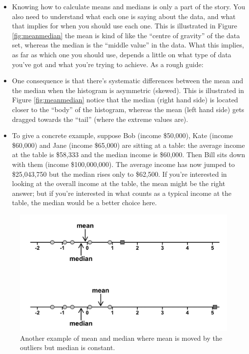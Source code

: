 \documentclass[
]{book}
\begin{document}
\begin{itemize}
\item
  Knowing how to calculate means and medians is only a part of the story. You also need to understand what each one is saying about the data, and what that implies for when you should use each one. This is illustrated in Figure \ref{fig:meanmedian} the mean is kind of like the ``centre of gravity'' of the data set, whereas the median is the ``middle value'' in the data. What this implies, as far as which one you should use, depends a little on what type of data you've got and what you're trying to achieve. As a rough guide:
\item
  One consequence is that there's systematic differences between the mean and the median when the histogram is asymmetric (skewed). This is illustrated in Figure \ref{fig:meanmedian} notice that the median (right hand side) is located closer to the ``body'' of the histogram, whereas the mean (left hand side) gets dragged towards the ``tail'' (where the extreme values are).
\item
  To give a concrete example, suppose Bob (income \$50,000), Kate (income \$60,000) and Jane (income \$65,000) are sitting at a table: the average income at the table is \$58,333 and the median income is \$60,000. Then Bill sits down with them (income \$100,000,000). The average income has now jumped to \$25,043,750 but the median rises only to \$62,500. If you're interested in looking at the overall income at the table, the mean might be the right answer; but if you're interested in what counts as a typical income at the table, the median would be a better choice here.
\end{itemize}

\begin{figure}
\centering
\includegraphics{./img/descriptives2/mean_median.png}
\caption{\label{fig:meanmedian2}Another example of mean and median where mean is moved by the outliers but median is constant.}
\end{figure}
\end{document}
